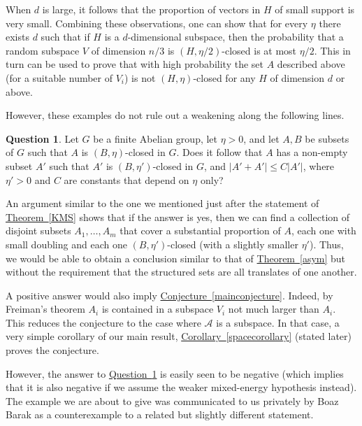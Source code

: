 \documentclass[11pt]{article}
\numberwithin{equation}{section}
\theoremstyle{definition}
\newtheorem{question}[theorem]{Question}
\theoremstyle{plain}
\newcommand{\expref}[2]{\hyperref[#2]{#1~\ref{#2}}}
\newcommand \cA{\mathcal A}
\begin{document}
When $d$ is large, it follows that the proportion of vectors in $H$ of small support is very small. Combining these observations, one can show that for every $\eta$ there exists $d$ such that if $H$ is a $d$-dimensional subspace, then the probability that a random subspace $V$ of dimension $n/3$ is $(H,\eta/2)$-closed is at most $\eta/2$. This in turn can be used to prove that with high probability the set $A$ described above (for a suitable number of $V_i$) is not $(H,\eta)$-closed for any $H$ of dimension $d$ or above.

However, these examples do not rule out a weakening along the following lines.

\begin{question}\label{wrongq}
	Let $G$ be a finite Abelian group, let $\eta>0$, and let $A,B$ be subsets of $G$ such that $A$ is $(B,\eta)$-closed in $G$. Does it follow that $A$ has a non-empty subset $A'$ such that $A'$ is $(B,\eta')$-closed in $G$, and $|A'+A'|\leq C|A'|$, where $\eta'>0$ and $C$ are constants that depend on $\eta$ only?
\end{question}

\noindent An argument similar to the one we mentioned just after the statement of \expref{Theorem}{KMS} shows that if the answer is yes, then we can find a collection of disjoint subsets $A_1,\dots,A_m$ that cover a substantial proportion of $A$, each one with small doubling and each one $(B,\eta')$-closed (with a slightly smaller $\eta'$). Thus, we would be able to obtain a conclusion similar to that of \expref{Theorem}{asym} but without the requirement that the structured sets are all translates of one another.

A positive answer would also imply \expref{Conjecture}{mainconjecture}. Indeed, by Freiman's theorem $A_i$ is contained in a subspace $V_i$ not much larger than $A_i$. This reduces the conjecture to the case where $\cA$ is a subspace. In that case, a very simple corollary of our main result, \expref{Corollary}{spacecorollary} (stated later) proves the conjecture.

However, the answer to \expref{Question}{wrongq} is easily seen to be negative (which implies that it is also negative if we assume the weaker mixed-energy hypothesis instead). The example we are about to give was communicated to us privately by Boaz Barak as a counterexample to a related but slightly different statement. 
\end{document}
